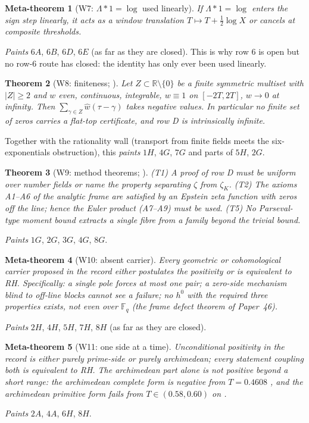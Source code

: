 \documentclass[11pt]{amsart}
\newtheorem{theorem}{Theorem}[section]
\newtheorem{metatheorem}[theorem]{Meta-theorem}
\theoremstyle{definition}
\theoremstyle{remark}
\newcommand{\R}{\mathbb R}
\begin{document}
\begin{metatheorem}[W7: $\Lambda*1=\log$ used linearly]\label{W7}
If $\Lambda*1=\log$ enters the sign step linearly, it acts as a window translation $T\mapsto T+\frac12\log X$
or cancels at composite thresholds.
\end{metatheorem}
\noindent \emph{Paints} $6A$, $6B$, $6D$, $6E$ (as far as they are closed). This is why row 6 is open but no row-6
route has closed: the identity has only ever been used linearly.

\begin{theorem}[W8: finiteness; ]\label{thm:finZ}
Let $Z\subset\R\setminus\{0\}$ be a finite symmetric multiset with $|Z|\ge2$ and $w$ even, continuous,
integrable, $w\equiv1$ on $[-2T,2T]$, $w\to0$ at infinity. Then $\sum_{\gamma\in Z}\widehat w(\tau-\gamma)$
takes negative values. In particular no finite set of zeros carries a flat-top certificate, and row D is
intrinsically infinite.
\end{theorem}
\noindent Together with the rationality wall (transport from finite fields meets the six-exponentials
obstruction), this \emph{paints} $1H$, $4G$, $7G$ and parts of $5H$, $2G$.

\begin{theorem}[W9: method theorems; ]\label{W9}
(T1) A proof of row D must be uniform over number fields or name the property separating $\zeta$ from
$\zeta_K$. (T2) The axioms A1--A6 of the analytic frame are satisfied by an Epstein zeta function with
zeros off the line; hence the Euler product (A7--A9) must be used. (T5) No Parseval-type moment bound
extracts a single fibre from a family beyond the trivial bound.
\end{theorem}
\noindent \emph{Paints} $1G$, $2G$, $3G$, $4G$, $8G$.

\begin{metatheorem}[W10: absent carrier]\label{W10}
Every geometric or cohomological carrier proposed in the record either postulates the positivity or is
equivalent to RH. Specifically: a single pole forces at most one pair; a zero-side mechanism blind to
off-line blocks cannot see a failure; no $h^0$ with the required three properties exists, not even over
$\mathbb F_q$ (the frame defect theorem of Paper~46).
\end{metatheorem}
\noindent \emph{Paints} $2H$, $4H$, $5H$, $7H$, $8H$ (as far as they are closed).

\begin{metatheorem}[W11: one side at a time]\label{W11}
Unconditional positivity in the record is either purely prime-side or purely archimedean; every statement
coupling both is equivalent to RH. The archimedean part alone is not positive beyond a short range:
the archimedean complete form is negative from $T=0.4608$ \cite[Prop.~10.7]{Paper47}, and the archimedean
primitive form fails from $T\in(0.58,0.60)$ on \cite[Thm.~12.5(i)]{Paper47}.
\end{metatheorem}
\noindent \emph{Paints} $2A$, $4A$, $6H$, $8H$.
\end{document}
